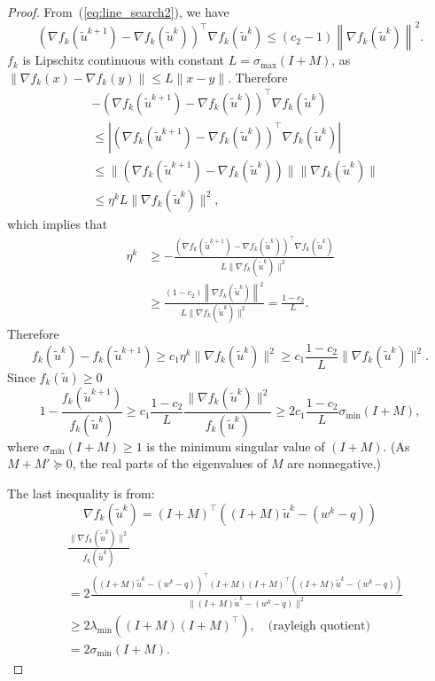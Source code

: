 \documentclass[10pt]{article} %
\begin{document}
\begin{proof}
From~(\ref{eq:line_search2}), we have
$$
\left(\nabla f_k(\tilde{u}^{k+1}) - \nabla f_k(\tilde{u}^k)\right)^\top \nabla f_k(\tilde{u}^k) \leq (c_2-1) \left\|\nabla f_k(\tilde{u}^k)\right\|^2.
$$
$f_k$ is Lipschitz continuous with constant $L=\sigma_{\max}(I+M)$, as $\|\nabla f_k(x) - \nabla f_k(y)\| \leq L\|x-y\|$.
Therefore 
$$
\begin{aligned}
& -(\nabla f_k(\tilde{u}^{k+1}) - \nabla f_k(\tilde{u}^k))^\top \nabla f_k(\tilde{u}^k) \\
& \leq |(\nabla f_k(\tilde{u}^{k+1}) - \nabla f_k(\tilde{u}^k))^\top \nabla f_k(\tilde{u}^k) |\\
&\leq \|(\nabla f_k(\tilde{u}^{k+1}) - \nabla f_k(\tilde{u}^k))\|\|\nabla f_k(\tilde{u}^k)\| \\
&\leq \eta^k L \|\nabla f_k(\tilde{u}^k)\|^2,
\end{aligned}
$$
which implies that
\begin{align*}
    \eta^k &\geq -\frac{(\nabla f_k(\tilde{u}^{k+1}) - \nabla f_k(\tilde{u}^k))^\top \nabla f_k(\tilde{u}^k)}{L \|\nabla f_k(\tilde{u}^k)\|^2 } \\
    & \geq \frac{(1-c_2) \left\|\nabla f_k(\tilde{u}^k)\right\|^2}{L \|\nabla f_k(\tilde{u}^k)\|^2 } = \frac{1-c_2}{L}.
\end{align*}
Therefore
$$
f_k(\tilde{u}^k) - f_k(\tilde{u}^{k+1}) \geq c_1 \eta^k \|\nabla f_k(\tilde{u}^k)\|^2 \geq c_1 \frac{1-c_2}{L} \|\nabla f_k(\tilde{u}^k)\|^2.
$$
Since $f_k(\tilde{u}) \geq 0$
$$
1 - \frac{f_k(\tilde{u}^{k+1})}{f_k(\tilde{u}^k)} \geq c_1 \frac{1-c_2}{L} \frac{\|\nabla f_k(\tilde{u}^k)\|^2}{f_k(\tilde{u}^k)} \geq 2c_1 \frac{1-c_2}{L} \sigma_{\min} (I+M),
$$ 
where $\sigma_{\min} (I+M) \geq 1$ is the minimum singular value of $(I+M)$. (As $M+M'\succeq 0$, the real parts of the eigenvalues of $M$ are nonnegative.)

The last inequality is from:
$$
\nabla f_k(\tilde{u}^k) = (I+M)^\top \left((I+M)\tilde{u}^k - (w^k-q)\right)
$$
$$
\begin{aligned}
    &\frac{\|\nabla f_k(\tilde{u}^k)\|^2}{f_k(\tilde{u}^k)} \\
    &= 2 \frac{\left((I+M)\tilde{u}^k - (w^k-q)\right)^\top (I+M)(I+M)^\top \left((I+M)\tilde{u}^k - (w^k-q)\right)}{\|(I+M)\tilde{u}^k - (w^k-q)\|^2}\\
    &\geq 2\lambda_{\min}\left((I+M)(I+M)^\top\right), \quad \text{(rayleigh quotient)}\\
    &=2\sigma_{\min}(I+M).
\end{aligned}
$$


\end{proof}
\end{document}
